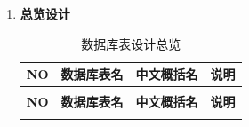 \begin{enumerate}

    \item \textbf{总览设计}

          \begin{longtable}{>{\centering\arraybackslash}m{0.5cm} >{\centering\arraybackslash}m{5cm} >{\centering\arraybackslash}m{3.5cm} >{\centering\arraybackslash}m{4.5cm}}

              \caption{数据库表设计总览} \label{tab:training}                                  \\

              \toprule
              \textbf{NO} & \textbf{数据库表名}          & \textbf{中文概括名} & \textbf{说明}     \\
              \midrule
              \endfirsthead

              \multicolumn{4}{c}{{\tablename\ \thetable{} 续表}}                         \\
              \toprule
              \textbf{NO} & \textbf{数据库表名}          & \textbf{中文概括名} & \textbf{说明}     \\
              \midrule
              \endhead

              \bottomrule
              \endfoot


\end{longtable}
\end{enumerate}

